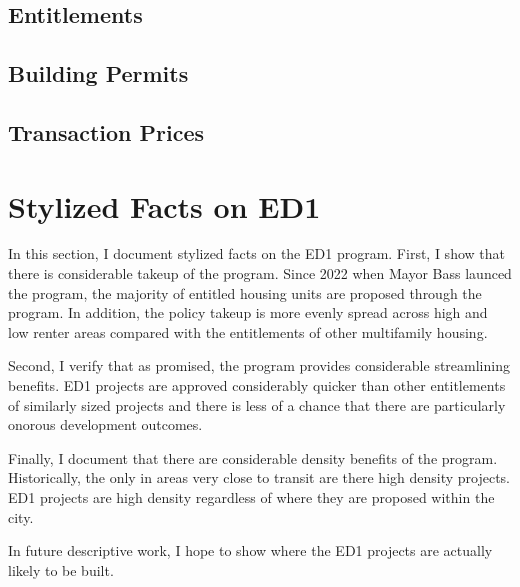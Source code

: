 \documentclass[12pt]{article}
\theoremstyle{definition}
\begin{document}
\subsection{Entitlements}
\subsection{Building Permits}
\subsection{Transaction Prices}


\section{Stylized Facts on ED1}
In this section, I document stylized facts on the ED1 program. First, I show that there is considerable takeup of the program. Since 2022 when Mayor Bass launced the program, the majority of entitled housing units are proposed through the program. In addition, the policy takeup is more evenly spread across high and low renter areas compared with the entitlements of other multifamily housing. 

Second, I verify that as promised, the program provides considerable streamlining benefits. ED1 projects are approved considerably quicker than other entitlements of similarly sized projects and there is less of a chance that there are particularly onorous development outcomes. 

Finally, I document that there are considerable density benefits of the program. Historically, the only in areas very close to transit are there high density projects. ED1 projects are high density regardless of where they are proposed within the city. 

In future descriptive work, I hope to show where the ED1 projects are actually likely to be built. 
\end{document}
